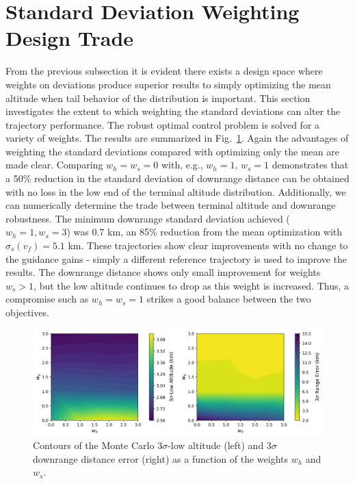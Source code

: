 \section{Standard Deviation Weighting Design Trade}\label{Sec:HeavyWeightTrade}
From the previous subsection it is evident there exists a design space where weights on deviations produce superior results to simply optimizing the mean altitude when tail behavior of the distribution is important. This section investigates the extent to which weighting the standard deviations can alter the trajectory performance. The robust optimal control problem is solved for a variety of weights. The results are summarized in Fig.~\ref{fig_weight_sweep}. Again the advantages of weighting the standard deviations compared with optimizing only the mean are made clear. Comparing $w_h=w_s=0$ with, e.g., $w_h=1,\,w_s = 1$ demonstrates that a 50\% reduction in the standard deviation of downrange distance can be obtained with no loss in the low end of the terminal altitude distribution. Additionally, we can numerically determine the trade between terminal altitude and downrange robustness. The minimum downrange standard deviation achieved ($w_h=1,w_s=3$) was 0.7 km, an 85\% reduction from the mean optimization with $\sigma_s(v_f)=5.1$ km. These trajectories show clear improvements with no change to the guidance gains - simply a different reference trajectory is used to improve the results. The downrange distance shows only small improvement for weights $w_s>1$, but the low altitude continues to drop as this weight is increased. Thus, a compromise such as $w_h=w_s=1$ strikes a good balance between the two objectives. 
\begin{figure}[h!]
	\centering
	\includegraphics[width=1\textwidth]{../PropellantOptimalJournal/ddp/python/Heavy_WeightSweepMCResults}
	\caption{Contours of the Monte Carlo 3$\sigma$-low altitude (left) and 3$\sigma$ downrange distance error (right) as a function of the weights $w_h$ and $w_s$.}
	\label{fig_weight_sweep}
\end{figure}

